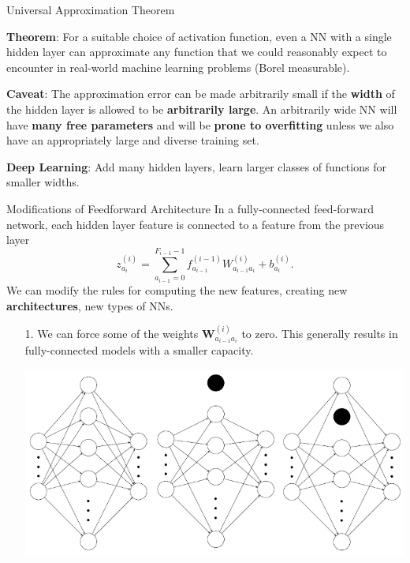 \documentclass[12pt,t]{beamer}
\begin{document}
\begin{frame}{Universal Approximation Theorem}

{\bf Theorem}: For a suitable choice of activation function, even a NN with a single hidden layer can approximate any function that we could reasonably expect to encounter in real-world machine learning problems (Borel measurable). 

{\bf Caveat}: The approximation error can be made arbitrarily small if the {\bf width} of the hidden layer is allowed to be {\bf arbitrarily large}. An arbitrarily wide NN will have {\bf many free parameters} and will be {\bf prone to overfitting} unless we also have an appropriately large and diverse training set.  

{\bf Deep Learning}: Add many hidden layers, learn larger classes of functions for smaller widths.

\end{frame}

\begin{frame}{Modifications of Feedforward Architecture}
In a fully-connected feed-forward network, each hidden layer feature is connected to a feature from the previous layer
$$ z_{a_i}^{(i)} = \sum_{a_{i-1}=0}^{F_{i-1}-1} f^{(i-1)}_{a_{i-1}} W_{a_{i-1} a_i}^{(i)} + b_{a_i}^{(i)}. $$
We can modify the rules for computing the new features, creating new {\bf architectures}, new types of NNs.

\begin{itemize}
\item[1.] We can force some of the weights  $\mathbf{W}^{(i)}_{a_{i-1}a_i}$ to zero.  This generally results in fully-connected models with a smaller capacity.
\centerline{
\includegraphics[height=0.2\textheight]{./images/dropout.png}
} 
\end{itemize}
\end{frame}
\end{document}
